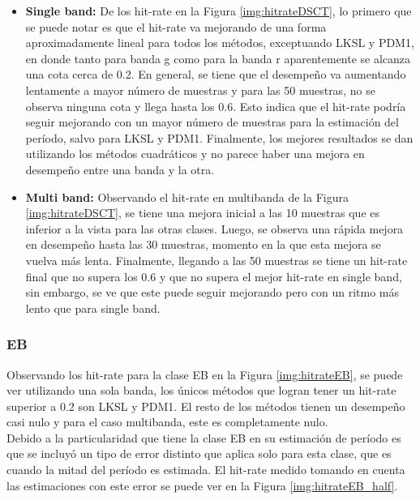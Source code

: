     	\begin{itemize}
    	    \item \textbf{Single band:} De los hit-rate en la Figura \ref{img:hitrateDSCT}, lo primero que se puede notar es que el hit-rate va mejorando de una forma aproximadamente lineal para todos los métodos, exceptuando LKSL y PDM1, en donde tanto para banda g como para la banda r aparentemente se alcanza una cota cerca de 0.2. En general, se tiene que el desempeño va aumentando lentamente a mayor número de muestras y para las 50 muestras, no se observa ninguna cota y llega hasta los 0.6. Esto indica que el hit-rate podría seguir mejorando con un mayor número de muestras para la estimación del período, salvo para LKSL y PDM1. Finalmente, los mejores resultados se dan utilizando los métodos cuadráticos y no parece haber una mejora en desempeño entre una banda y la otra.
    	    
    	    \item \textbf{Multi band:}  Observando el hit-rate en multibanda de la Figura \ref{img:hitrateDSCT}, se tiene una mejora inicial a las 10 muestras que es inferior a la vista para las otras clases. Luego, se observa una rápida mejora en desempeño hasta las 30 muestras, momento en la que esta mejora se vuelva más lenta. Finalmente, llegando a las 50 muestras se tiene un hit-rate final que no supera los 0.6 y que no supera el mejor hit-rate en single band, sin embargo, se ve que este puede seguir mejorando pero con un ritmo más lento que para single band.
    	\end{itemize}    	





        \subsubsection{EB}
    	
    	Observando los hit-rate para la clase EB en la Figura \ref{img:hitrateEB}, se puede ver utilizando una sola banda, los únicos métodos que logran tener un hit-rate superior a 0.2 son LKSL y PDM1. El resto de los métodos tienen un desempeño casi nulo y para el caso multibanda, este es completamente nulo.\\
    	
    	Debido a la particularidad que tiene la clase EB en su estimación de período es que se incluyó un tipo de error distinto que aplica solo para esta clase, que es cuando la mitad del período es estimada. El hit-rate medido tomando en cuenta las estimaciones con este error se puede ver en la Figura \ref{img:hitrateEB_half}.
    	
